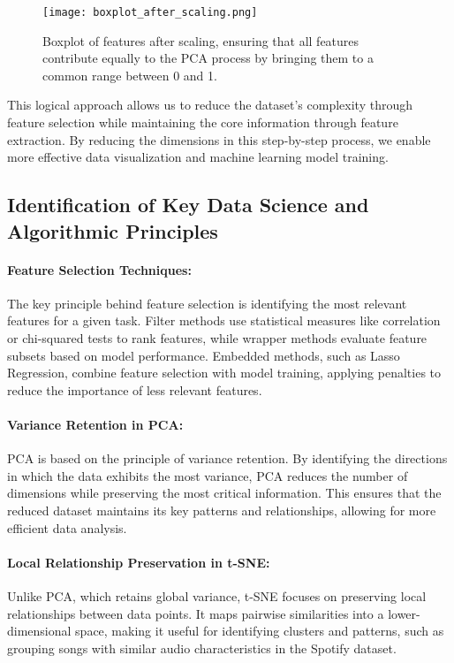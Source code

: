\documentclass{article}
\begin{document}
\begin{figure}[h!]
    \centering
    \texttt{[image: boxplot\_after\_scaling.png]}
    \caption{Boxplot of features after scaling, ensuring that all features contribute equally to the PCA process by bringing them to a common range between 0 and 1.}
\end{figure}

This logical approach allows us to reduce the dataset’s complexity through feature selection while maintaining the core information through feature extraction. By reducing the dimensions in this step-by-step process, we enable more effective data visualization and machine learning model training.

\subsection{Identification of Key Data Science and Algorithmic Principles}

\paragraph{Feature Selection Techniques:}
The key principle behind feature selection is identifying the most relevant features for a given task. Filter methods use statistical measures like correlation or chi-squared tests to rank features, while wrapper methods evaluate feature subsets based on model performance. Embedded methods, such as Lasso Regression, combine feature selection with model training, applying penalties to reduce the importance of less relevant features.

\paragraph{Variance Retention in PCA:}
PCA is based on the principle of variance retention. By identifying the directions in which the data exhibits the most variance, PCA reduces the number of dimensions while preserving the most critical information. This ensures that the reduced dataset maintains its key patterns and relationships, allowing for more efficient data analysis.

\paragraph{Local Relationship Preservation in t-SNE:}
Unlike PCA, which retains global variance, t-SNE focuses on preserving local relationships between data points. It maps pairwise similarities into a lower-dimensional space, making it useful for identifying clusters and patterns, such as grouping songs with similar audio characteristics in the Spotify dataset. 
\end{document}
